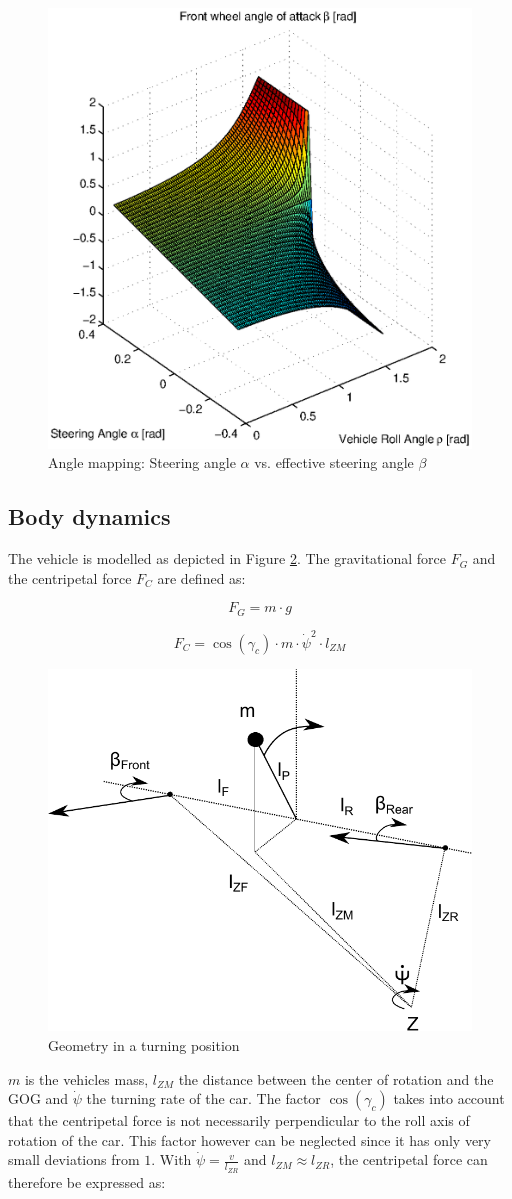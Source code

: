 \documentclass[conference]{IEEEtran}
\begin{document}
\begin{figure}[Hhh]
\centering
  \includegraphics[width=.4\textwidth]{pics/angle_plot.eps} 
  \caption{Angle mapping: Steering angle $\alpha$ vs. effective steering angle $\beta$}  
  \label{figure:angle_plot}
\end{figure}


\subsection{Body dynamics}

The vehicle is modelled as depicted in Figure \ref{figure:geometry}. The gravitational force $F_G$ and the centripetal force $F_C$ are defined as:

\begin{equation}
{F_G} = m \cdot g
\end{equation}

\begin{equation}
{F_C} = \cos \left( {{\gamma _c}} \right) \cdot m \cdot {{\dot \psi }^2} \cdot {l_{ZM}}
\end{equation}

\begin{figure}[h]
\centering
  \includegraphics[width=.47\textwidth]{pics/setup} 
  \caption{Geometry in a turning position}  
  \label{figure:geometry}
\end{figure}

$m$ is the vehicles mass, $l_{ZM}$ the distance between the center of rotation and the GOG and $\dot \psi$ the turning rate of the car. The factor $\cos \left( {{\gamma _c}} \right)$ takes into account that the centripetal force is not necessarily perpendicular to the roll axis of rotation of the car. This factor however can be neglected since it has only very small deviations from $1$. With $\dot \psi  = \frac{v}{{{l_{ZR}}}}$ and ${l_{ZM}} \approx {l_{ZR}}$, the centripetal force can therefore be expressed as:
\end{document}
